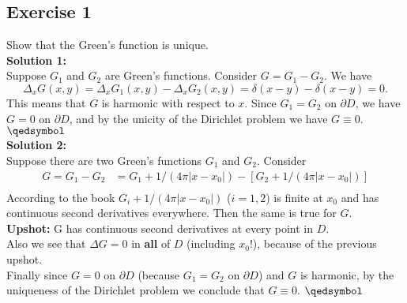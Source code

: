 \documentclass[12pt]{article}%
\begin{document}
\subsection*{Exercise 1}
Show that the Green's function is unique.\\
\textbf{Solution 1:}\\
Suppose $G_1$ and $G_2$ are Green's functions. Consider $G=G_1-G_2$. We have
\[
    \Delta_x G(x,y)=\Delta_x G_1(x,y)-\Delta_x G_2(x,y) = \delta(x-y) -
    \delta(x-y) =0.
\]
This means that $G$ is harmonic with respect to $x$. Since
$G_1=G_2$ on $\partial D$, we have $G=0$ on $\partial D$, and by the unicity of
the Dirichlet problem we have $G\equiv0$. $\qedsymbol$
\\\textbf{Solution 2:}\\
Suppose there are two Green's functions $G_1$ and $G_2$. Consider
\begin{align*}
    G=G_1-G_2&= G_1 + 1/(4\pi |x-x_0|) - [G_2 + 1/(4\pi |x-x_0|)]\\
\end{align*}
According to the book $G_i+1/(4\pi|x-x_0|)$ ($i=1,2$) is finite at $x_0$ and
has continuous second derivatives everywhere. Then the same is true for $G$.\\
\textbf{Upshot:} G has continuous second derivatives at every point in $D$.\\
Also we see that $\Delta G =0$ in \textbf{all} of $D$ (including $x_0$!),
because of the previous upshot.\\
Finally since $G=0$ on $\partial D$ (because $G_1=G_2$ on $\partial D$) and $G$
is harmonic, by the uniqueness of the Dirichlet problem we conclude that
$G\equiv0$. $\qedsymbol$
\end{document}
